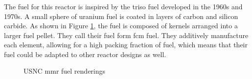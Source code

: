 The fuel for this reactor is inspired by the \gls{triso} fuel developed in the 1960s and 1970s. A small sphere of uranium fuel is coated in layers of carbon and silicon carbide. As shown in Figure \ref{fig:usnc_fuel}, the fuel is composed of kernels arranged into a larger fuel pellet. They call their fuel form \gls{fcm} fuel. They additively manufacture each element, allowing for a high packing fraction of fuel, which means that their fuel could be adapted to other reactor designs as well.

\begin{figure}[H]
    \hfill
    \caption{
    USNC \gls{mmr} fuel renderings
      \cite{usnc_media_kit}}
    \label{fig:usnc_fuel}
\end{figure}

